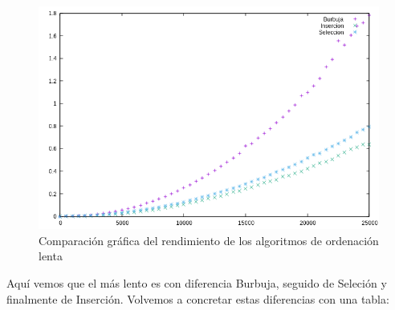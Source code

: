 \documentclass{article}
\begin{document}
	\begin{figure}[H]
		\centering
		\includegraphics[totalheight=8cm]{img/ordenacion_lenta}
		\caption{Comparación gráfica del rendimiento de los algoritmos de ordenación lenta}
		\label{fig:ordenacion_lenta}
	\end{figure}
Aquí vemos que el más lento es con diferencia Burbuja, seguido de Seleción y finalmente de Inserción. Volvemos a concretar estas diferencias con una tabla:
\end{document}
